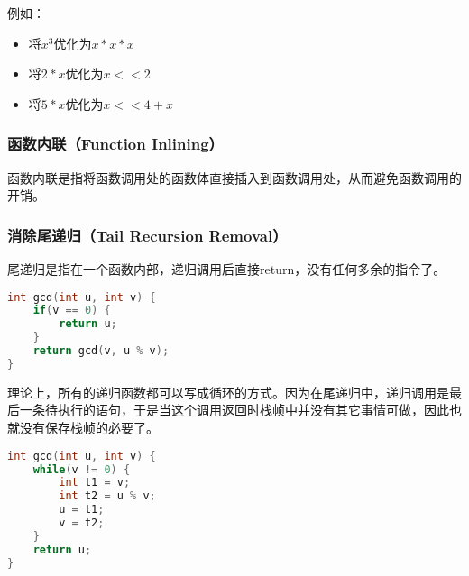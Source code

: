 例如：

\begin{itemize}
    \item 将$ x^3 $优化为$ x * x * x $
    \item 将$ 2 * x $优化为$ x << 2 $
    \item 将$ 5 * x $优化为$ x << 4 + x $
\end{itemize}

\vspace{0.5cm}

\subsubsection{函数内联（Function Inlining）}

函数内联是指将函数调用处的函数体直接插入到函数调用处，从而避免函数调用的开销。\\

\subsubsection{消除尾递归（Tail Recursion Removal）}

尾递归是指在一个函数内部，递归调用后直接return，没有任何多余的指令了。

\vspace{-0.5cm}

\begin{lstlisting}[language=C]
int gcd(int u, int v) {
    if(v == 0) {
        return u;
    }
    return gcd(v, u % v);
}
\end{lstlisting}

理论上，所有的递归函数都可以写成循环的方式。因为在尾递归中，递归调用是最后一条待执行的语句，于是当这个调用返回时栈帧中并没有其它事情可做，因此也就没有保存栈帧的必要了。
\vspace{-0.5cm}

\begin{lstlisting}[language=C]
int gcd(int u, int v) {
    while(v != 0) {
        int t1 = v;
        int t2 = u % v;
        u = t1;
        v = t2;
    }
    return u;
}
\end{lstlisting}